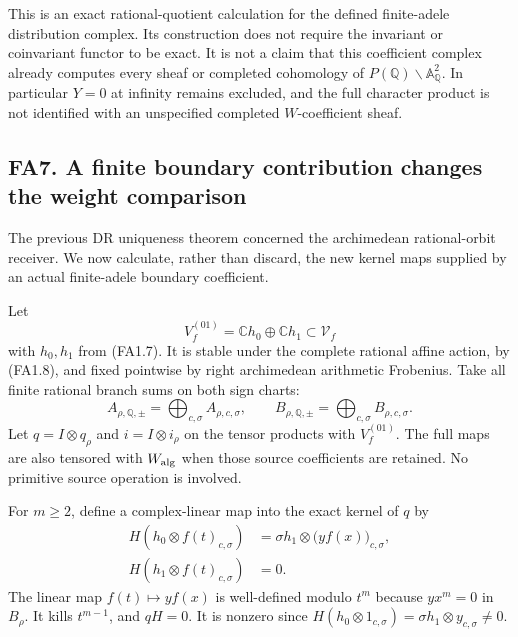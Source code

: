 This is an exact rational-quotient calculation for the defined
finite-adele distribution complex. Its construction does not require the
invariant or coinvariant functor to be exact. It is not a claim that
this coefficient complex already computes every sheaf or completed
cohomology of \(P(\mathbb Q)\backslash\mathbb A_{\mathbb Q}^2\). In
particular \(Y=0\) at infinity remains excluded, and the full character
product is not identified with an unspecified completed
\(W\)-coefficient sheaf.

\subsection{FA7. A finite boundary contribution changes the weight
comparison}\label{fa7.-a-finite-boundary-contribution-changes-the-weight-comparison}

The previous DR uniqueness theorem concerned the archimedean
rational-orbit receiver. We now calculate, rather than discard, the new
kernel maps supplied by an actual finite-adele boundary coefficient.

Let \[
 V_f^{(01)}=\mathbb C h_0\oplus\mathbb C h_1
      \subset\mathscr V_f
\tag{FA7.1}
\] with \(h_0,h_1\) from (FA1.7). It is stable under the complete
rational affine action, by (FA1.8), and fixed pointwise by right
archimedean arithmetic Frobenius. Take all finite rational branch sums
on both sign charts: \[
 A_{\rho,\mathbb Q,\pm}
    =\bigoplus_{c,\sigma} A_{\rho,c,\sigma},\qquad
 B_{\rho,\mathbb Q,\pm}
    =\bigoplus_{c,\sigma} B_{\rho,c,\sigma}.
\] Let \(q=I\otimes q_\rho\) and \(i=I\otimes i_\rho\) on the tensor
products with \(V_f^{(01)}\). The full maps are also tensored with
\(W_{\rm alg}\) when those source coefficients are retained. No
primitive source operation is involved.

For \(m\ge2\), define a complex-linear map into the exact kernel of
\(q\) by \[
 \begin{aligned}
 H(h_0\otimes f(t)_{c,\sigma})
    &=\sigma h_1\otimes
           \bigl(y f(x)\bigr)_{c,\sigma},\\
 H(h_1\otimes f(t)_{c,\sigma})&=0.
 \end{aligned}
\tag{FA7.2}
\] The linear map \(f(t)\mapsto yf(x)\) is well-defined modulo \(t^m\)
because \(yx^m=0\) in \(B_\rho\). It kills \(t^{m-1}\), and \(qH=0\). It
is nonzero since \(H(h_0\otimes1_{c,\sigma})
=\sigma h_1\otimes y_{c,\sigma}\ne0\).

